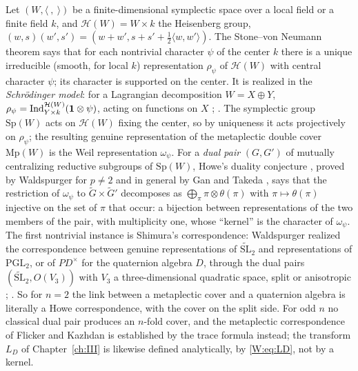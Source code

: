 Let $(W,\langle\ ,\ \rangle)$ be a finite-dimensional symplectic space
over a local field or a finite field $k$, and $\mathcal H(W)=W\times k$
the Heisenberg group, $(w,s)(w',s')=(w+w',s+s'+\tfrac12\langle w,w'\rangle)$.
The Stone--von Neumann theorem says that for each nontrivial character
$\psi$ of the center $k$ there is a unique irreducible (smooth, for local
$k$) representation $\rho_\psi$ of $\mathcal H(W)$ with central character
$\psi$; its character is supported on the center.  It is realized in the
\emph{Schr\"odinger model}: for a Lagrangian decomposition $W=X\oplus Y$,
$\rho_\psi=\operatorname{Ind}_{Y\times k}^{\mathcal H(W)}(\mathbf1\otimes\psi)$, acting on
functions on $X$ \cite{Wei64}; \cite[Ch.~2]{MVW87}.  The symplectic group $\mathrm{Sp}(W)$
acts on $\mathcal H(W)$ fixing the center, so by uniqueness it acts
projectively on $\rho_\psi$; the resulting genuine representation of the
metaplectic double cover $\mathrm{Mp}(W)$ is the Weil representation
$\omega_\psi$.  For a \emph{dual pair} $(G,G')$ of mutually
centralizing reductive subgroups of $\mathrm{Sp}(W)$, Howe's duality
conjecture \cite{How79}, proved by Waldspurger for $p\ne2$ \cite{Wal90} and in
general by Gan and Takeda \cite{GT16}, says that the restriction of
$\omega_\psi$ to $\tilde G\times\tilde G'$ decomposes as
$\bigoplus_\pi\pi\otimes\theta(\pi)$ with $\pi\mapsto\theta(\pi)$
injective on the set of $\pi$ that occur: a bijection between
representations of the two members of the pair, with multiplicity one,
whose ``kernel'' is the character of $\omega_\psi$.  The first
nontrivial instance is Shimura's correspondence: Waldspurger realized
the correspondence between genuine representations of
$\widetilde{\mathrm{SL}}_2$ and representations of $\mathrm{PGL}_2$,
or of $PD^\times$ for the quaternion algebra $D$, through the dual pairs
$(\widetilde{\mathrm{SL}}_2,O(V_3))$ with $V_3$ a three-dimensional
quadratic space, split or anisotropic \cite{Wal80}; \cite{Wal91}.  So for $n=2$ the
link between a metaplectic cover and a quaternion algebra is literally
a Howe correspondence, with the cover on the split side.  For odd $n$
no classical dual pair produces an $n$-fold cover, and the metaplectic
correspondence of Flicker and Kazhdan \cite{FK86} is established by the trace
formula instead; the transform $L_D$ of Chapter~\ref{ch:III} is likewise defined
analytically, by \eqref{W:eq:LD}, not by a kernel.

